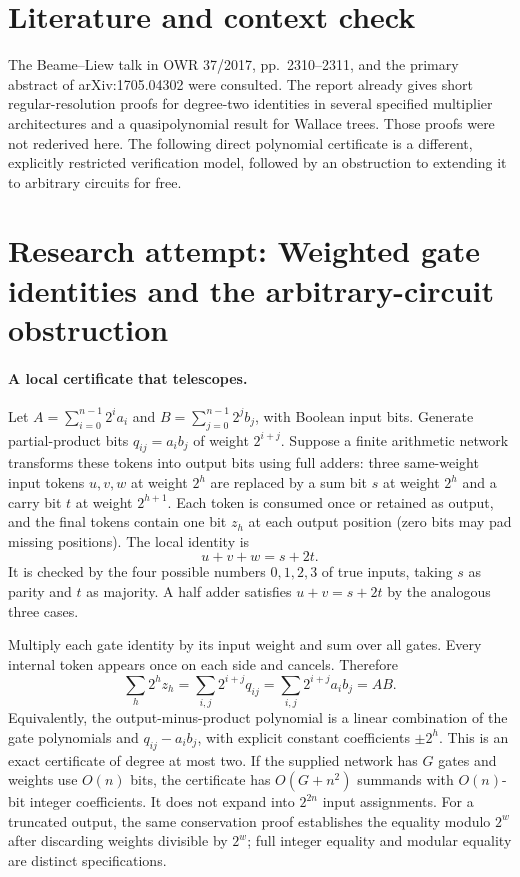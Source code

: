 \documentclass[11pt]{article}
\begin{document}
\section{Literature and context check}
The Beame--Liew talk in OWR 37/2017, pp.~2310--2311, and the primary abstract of arXiv:1705.04302 were consulted. The report already gives short regular-resolution proofs for degree-two identities in several specified multiplier architectures and a quasipolynomial result for Wallace trees. Those proofs were not rederived here. The following direct polynomial certificate is a different, explicitly restricted verification model, followed by an obstruction to extending it to arbitrary circuits for free.
\section{Research attempt: Weighted gate identities and the arbitrary-circuit obstruction}

\paragraph{A local certificate that telescopes.}
Let $A=\sum_{i=0}^{n-1}2^i a_i$ and $B=\sum_{j=0}^{n-1}2^j b_j$, with Boolean input bits. Generate partial-product bits $q_{ij}=a_i b_j$ of weight $2^{i+j}$. Suppose a finite arithmetic network transforms these tokens into output bits using full adders: three same-weight input tokens $u,v,w$ at weight $2^h$ are replaced by a sum bit $s$ at weight $2^h$ and a carry bit $t$ at weight $2^{h+1}$. Each token is consumed once or retained as output, and the final tokens contain one bit $z_h$ at each output position (zero bits may pad missing positions). The local identity is
\[
 u+v+w=s+2t.
\]
It is checked by the four possible numbers $0,1,2,3$ of true inputs, taking $s$ as parity and $t$ as majority. A half adder satisfies $u+v=s+2t$ by the analogous three cases.

Multiply each gate identity by its input weight and sum over all gates. Every internal token appears once on each side and cancels. Therefore
\[
 \sum_h2^h z_h=\sum_{i,j}2^{i+j}q_{ij}
 =\sum_{i,j}2^{i+j}a_i b_j=AB.
\]
Equivalently, the output-minus-product polynomial is a linear combination of the gate polynomials and $q_{ij}-a_i b_j$, with explicit constant coefficients $\pm2^h$. This is an exact certificate of degree at most two. If the supplied network has $G$ gates and weights use $O(n)$ bits, the certificate has $O(G+n^2)$ summands with $O(n)$-bit integer coefficients. It does not expand into $2^{2n}$ input assignments. For a truncated output, the same conservation proof establishes the equality modulo $2^w$ after discarding weights divisible by $2^w$; full integer equality and modular equality are distinct specifications.
\end{document}
